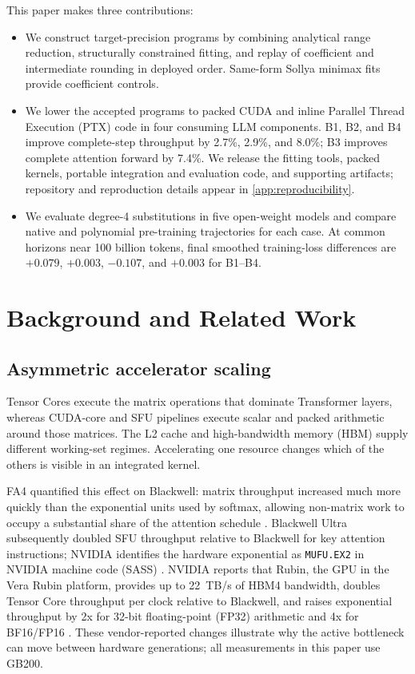 \documentclass[11pt]{article}
\begin{document}
This paper makes three contributions:
\begin{itemize}[leftmargin=1.4em]
    \item We construct target-precision programs by combining analytical range
    reduction, structurally constrained fitting, and replay of coefficient and
    intermediate rounding in deployed order. Same-form Sollya minimax fits
    provide coefficient controls.
    \item We lower the accepted programs to packed CUDA and inline Parallel
    Thread Execution (PTX) code in four consuming LLM components. B1, B2, and
    B4 improve complete-step throughput by 2.7\%, 2.9\%, and 8.0\%; B3 improves
    complete attention forward by 7.4\%. We release the fitting tools, packed
    kernels, portable integration and evaluation code, and supporting artifacts;
    repository and reproduction details appear in \cref{app:reproducibility}.
    \item We evaluate degree-4 substitutions in five open-weight models and
    compare native and polynomial pre-training trajectories for each case. At
    common horizons near 100 billion tokens, final smoothed training-loss
    differences are $+0.079$, $+0.003$, $-0.107$, and $+0.003$ for B1--B4.
\end{itemize}

\section{Background and Related Work}

\subsection{Asymmetric accelerator scaling}

Tensor Cores execute the matrix operations that dominate Transformer layers,
whereas CUDA-core and SFU pipelines execute scalar and packed arithmetic around
those matrices. The L2 cache and high-bandwidth memory (HBM) supply different
working-set regimes. Accelerating one resource changes which of the others is
visible in an integrated kernel.

FA4 quantified this effect on Blackwell: matrix throughput increased much more
quickly than the exponential units used by softmax, allowing non-matrix work to
occupy a substantial share of the attention schedule
\cite{zadouri2026flashattention4}. Blackwell Ultra subsequently doubled SFU
throughput relative to Blackwell for key attention instructions; NVIDIA
identifies the hardware exponential as \texttt{MUFU.EX2} in NVIDIA machine code
(SASS)
\cite{aubrey2025blackwellultra,nvidia2026blackwellultrasoftmax}.
NVIDIA reports that Rubin, the GPU in the Vera Rubin platform, provides up to
22~TB/s of HBM4 bandwidth, doubles Tensor Core throughput per clock relative
to Blackwell, and raises exponential throughput by 2x for 32-bit
floating-point (FP32) arithmetic and 4x for
BF16/FP16 \cite{alvarez2026rubinarchitecture}. These vendor-reported changes
illustrate why the active bottleneck can move between hardware generations;
all measurements in this paper use GB200.
\end{document}

